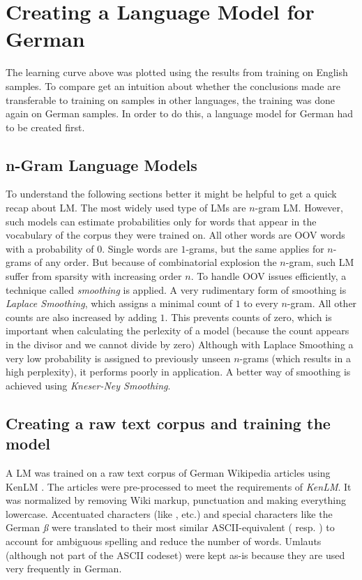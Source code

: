 \section{Creating a Language Model for German}\label{lm}

The learning curve above was plotted using the results from training on English samples. To compare get an intuition about whether the conclusions made are transferable to training on samples in other languages, the training was done again on German samples. In order to do this, a language model for German had to be created first. 

\subsection{n-Gram Language Models}

To understand the following sections better it might be helpful to get a quick recap about \ac{LM}. The most widely used type of LMs are $n$-gram LM. However, such models can estimate probabilities only for words that appear in the vocabulary of the corpus they were trained on. All other words are \ac{OOV} words with a probability of $0$. Single words are $1$-grams, but the same applies for $n$-grams of any order. But because of combinatorial explosion the $n$-gram, such \ac{LM} suffer from sparsity with increasing order $n$. To handle \ac{OOV} issues efficiently, a technique called \textit{smoothing} is applied. A very rudimentary form of smoothing is \textit{Laplace Smoothing}, which assigns a minimal count of $1$ to every $n$-gram. All other counts are also increased by adding $1$. This prevents counts of zero, which is important when calculating the perlexity of a model (because the count appears in the divisor and we cannot divide by zero) Although with Laplace Smoothing a very low probability is assigned to previously unseen $n$-grams (which results in a high perplexity), it performs poorly in application. A better way of smoothing is achieved using \textit{Kneser-Ney Smoothing}.

\subsection{Creating a raw text corpus and training the model}

A LM was trained on a raw text corpus of German Wikipedia articles using KenLM \parencite{kenlm}. The articles were pre-processed to meet the requirements of \textit{KenLM}.
It was normalized by removing Wiki markup, punctuation and making everything lowercase. Accentuated characters (like , etc.) and special characters like the German \textit{ß} were translated to their most similar ASCII-equivalent ( resp. ) to account for ambiguous spelling and reduce the number of words. Umlauts (although not part of the ASCII codeset) were kept as-is because they are used very frequently in German. 

